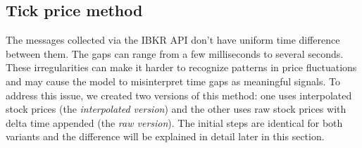 \documentclass[a4paper,oneside,onecolumn,12pt]{book}
\begin{document}
	\subsection{Tick price method}
	The messages collected via the IBKR API don't have uniform time difference between them. The gaps can range from a few milliseconds to several seconds. These irregularities can make it harder to recognize patterns in price fluctuations and may cause the model to misinterpret time gaps as meaningful signals. To address this issue, we created two versions of this method: one uses interpolated stock prices (the \textit{interpolated version}) and the other uses raw stock prices with delta time appended (the \textit{raw version}). The initial steps are identical for both variants and the difference will be explained in detail later in this section.
\end{document}

